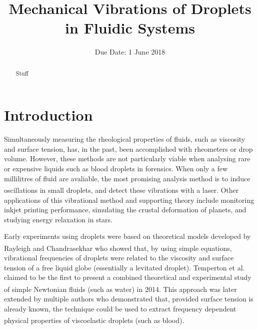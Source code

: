 \documentclass{physics_article_B}
\title{Mechanical Vibrations of Droplets in Fluidic Systems}
\date{Due Date: 1 June 2018}
\begin{document}
	
\setcounter{page}{0}
%

\begin{abstract}
	\large{Stuff 
}
\end{abstract}
	

\tableofcontents

\setcounter{page}{1}
\setlength{\parskip}{6pt}  
\newpage
{} 
\setcounter{page}{1}

\section{Introduction\label{sect:intro}}

Simultaneously measuring the rheological properties of fluids, such as viscosity and surface tension, has, in the past, been accomplished with rheometers or drop volume. However, these methods are not particularly viable when analysing rare or expensive liquids such as blood droplets in forensics. When only a few millilitres of fluid are avaliable, the most promising analysis method is to induce oscillations in small droplets\textsuperscript{\cite{harrold}}, and detect these vibrations with a laser. Other applications of this vibrational method and supporting theory include monitoring inkjet printing performance\cite{Martin2008}, simulating the crustal deformation of planets\cite{vukasinovic}, and studying energy relaxation in stars\cite{vukasinovic}.

Early experiments using droplets were based on theoretical models developed by Rayleigh\textsuperscript{\cite{rayleigh}} and Chandrasekhar\textsuperscript{\cite{chandrasekhar2}} who showed that, by using simple equations, vibrational frequencies of droplets were related to the viscosity and surface tension of a free liquid globe (essentially a levitated droplet). Temperton et al. claimed to be the first to present a combined theoretical and experimental study of simple Newtonian fluids (such as water) in 2014\textsuperscript{\cite{temperton}}. This approach was later extended by multiple authors who demonstrated that, provided surface tension is already known, the technique could be used to extract frequency dependent physical properties of viscoelastic droplets (such as blood)\textsuperscript{\cite{egry}}. 
\end{document}
